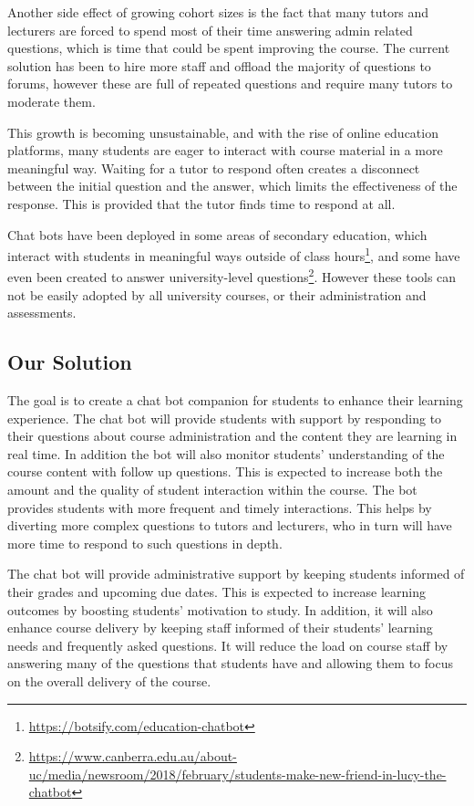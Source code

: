 \documentclass{article}
\begin{document}
Another side effect of growing cohort sizes is the fact that many tutors and lecturers are forced to spend most of their time answering admin related questions, which is time that could be spent improving the course. The current solution has been to hire more staff and offload the majority of questions to forums, however these are full of repeated questions and require many tutors to moderate them.

This growth is becoming unsustainable, and with the rise of online education platforms, many students are eager to interact with course material in a more meaningful way. Waiting for a tutor to respond often creates a disconnect between the initial question and the answer, which limits the effectiveness of the response. This is provided that the tutor finds time to respond at all.

Chat bots have been deployed in some areas of secondary education, which interact with students in meaningful ways outside of class hours\footnote{\url{https://botsify.com/education-chatbot}}, and some have even been created to answer university-level questions\footnote{\url{https://www.canberra.edu.au/about-uc/media/newsroom/2018/february/students-make-new-friend-in-lucy-the-chatbot}}. However these tools can not be easily adopted by all university courses, or their administration and assessments.

\subsection{Our Solution}

The goal is to create a chat bot companion for students to enhance their learning experience. The chat bot will provide students with support by responding to their questions about course administration and the content they are learning in real time. In addition the bot will also monitor students' understanding of the course content with follow up questions. This is expected to increase both the amount and the quality of student interaction within the course. The bot provides students with more frequent and timely interactions. This helps by diverting more complex questions to tutors and lecturers, who in turn will have more time to respond to such questions in depth. 

The chat bot will provide administrative support by keeping students informed of their grades and upcoming due dates. This is expected to increase learning outcomes by boosting students' motivation to study. In addition, it will also enhance course delivery by keeping staff informed of their students' learning needs and frequently asked questions. It will reduce the load on course staff by answering many of the questions that students have and allowing them to focus on the overall delivery of the course. 
\end{document}
